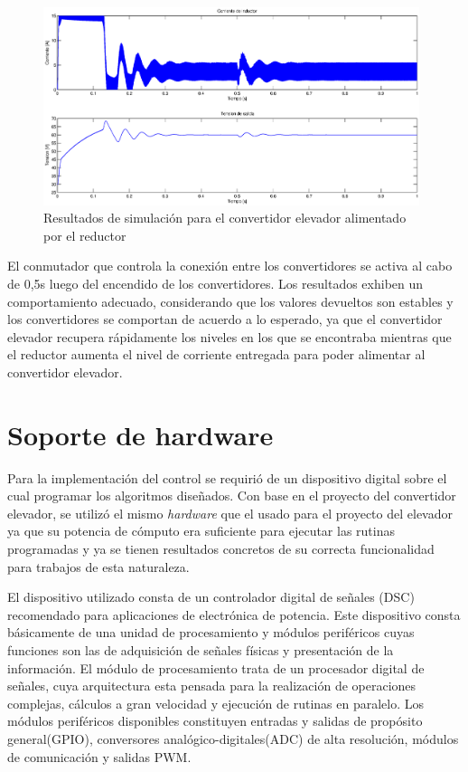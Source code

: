 \begin{figure}[H]
  \centering
  \includegraphics[width=11cm]{gfx/elevador_acoplado}
  \caption{Resultados de simulación para el convertidor elevador alimentado por el reductor}
  \label{fig:elevador_acoplado}
\end{figure}
El conmutador que controla la conexión entre los convertidores se activa al cabo de 0,5s luego del encendido de los convertidores. Los resultados
exhiben un comportamiento adecuado, considerando que los valores devueltos son estables y los convertidores se comportan de acuerdo a lo esperado, 
ya que el convertidor elevador recupera rápidamente los niveles en los que se encontraba mientras que el reductor aumenta el nivel de corriente 
entregada para poder alimentar al convertidor elevador.
\section{Soporte de hardware}
Para la implementación del control se requirió de un dispositivo digital sobre el cual programar los algoritmos diseñados. Con base en el
proyecto del convertidor elevador, se utilizó el mismo \emph{hardware} que el usado para el proyecto del elevador ya que su potencia de cómputo
era suficiente para ejecutar las rutinas programadas y ya se tienen resultados concretos de su correcta funcionalidad para trabajos de esta naturaleza.

El dispositivo utilizado consta de un controlador digital de señales (DSC) recomendado para aplicaciones de electrónica de potencia. Este dispositivo
consta básicamente de una unidad de procesamiento y módulos periféricos cuyas funciones son las de adquisición de señales físicas y presentación de la información.
El módulo de procesamiento trata de un procesador digital de señales, cuya arquitectura esta pensada para la realización de operaciones complejas,
cálculos a gran velocidad y ejecución de rutinas en paralelo. Los módulos periféricos disponibles constituyen entradas y salidas de propósito general(GPIO),
conversores analógico-digitales(ADC) de alta resolución, módulos de comunicación y salidas PWM.

